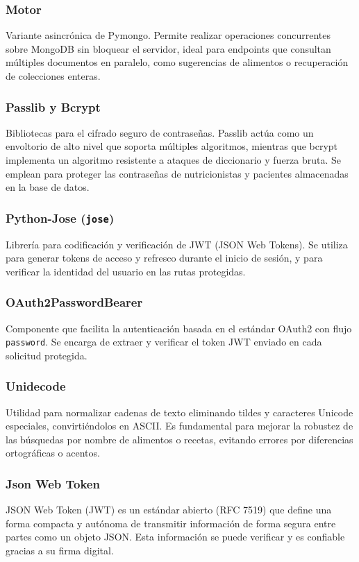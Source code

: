 \subsubsection*{Motor\cite{motor}}
Variante asincrónica de Pymongo. Permite realizar operaciones concurrentes sobre MongoDB sin bloquear el servidor, ideal para endpoints que consultan múltiples documentos en paralelo, como sugerencias de alimentos o recuperación de colecciones enteras.

\subsubsection*{Passlib y Bcrypt}
Bibliotecas para el cifrado seguro de contraseñas. Passlib\cite{passlib} actúa como un envoltorio de alto nivel que soporta múltiples algoritmos, mientras que bcrypt\cite{bcrypt} implementa un algoritmo resistente a ataques de diccionario y fuerza bruta. Se emplean para proteger las contraseñas de nutricionistas y pacientes almacenadas en la base de datos.

\subsubsection*{Python-Jose \cite{pythonjose} (\texttt{jose})}
Librería para codificación y verificación de JWT (JSON Web Tokens). Se utiliza para generar tokens de acceso y refresco durante el inicio de sesión, y para verificar la identidad del usuario en las rutas protegidas.

\subsubsection*{OAuth2PasswordBearer\cite{oauth2fastapi}}
Componente que facilita la autenticación basada en el estándar OAuth2 con flujo \texttt{password}. Se encarga de extraer y verificar el token JWT enviado en cada solicitud protegida.

\subsubsection*{Unidecode\cite{unidecode}}
Utilidad para normalizar cadenas de texto eliminando tildes y caracteres Unicode especiales, convirtiéndolos en ASCII. Es fundamental para mejorar la robustez de las búsquedas por nombre de alimentos o recetas, evitando errores por diferencias ortográficas o acentos.

\subsubsection*{Json Web Token \cite{JWT}}
JSON Web Token (JWT) es un estándar abierto (RFC 7519\cite{rfc7519}) que define una forma compacta y autónoma de transmitir información de forma segura entre partes como un objeto JSON. Esta información se puede verificar y es confiable gracias a su firma digital. 

